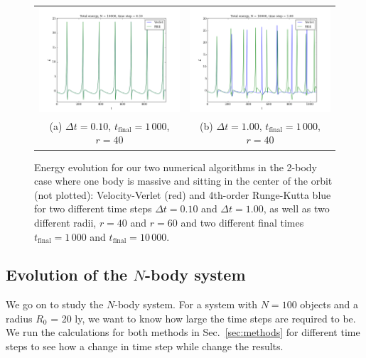 \documentclass{article}
\begin{document}
\begin{multicols}{2}
\begin{figure}
\begin{center}
\begin{tabular}{cc}
  	\includegraphics[width=90mm]{Images/binary_E_01.png}
	& \includegraphics[width=90mm]{Images/binary_E_1.png} \\
	(a) $\Delta t = 0.10$, $t_{\mathrm{final}} = 1\,000$, $r = 40$				& (b) $\Delta t = 1.00$, $t_{\mathrm{final}} = 1\,000$, $r = 40$  \\[6pt]
\end{tabular}
\caption{Energy evolution for our two numerical algorithms in the 2-body case where one body is massive and sitting in the center of the orbit (not plotted): Velocity-Verlet (red) and 4th-order Runge-Kutta blue for two different time steps $\Delta t = 0.10$ and $\Delta t = 1.00$, as well as two different radii, $r = 40$ and $r = 60$ and two different final times $t_{\mathrm{final}} = 1\,000$ and $t_{\mathrm{final}} = 10\,000$.}\label{fig:2_body_energy}
\end{center}
\end{figure}



\subsection{Evolution of the $N$-body system}
We go on to study the $N$-body system. For a system with $N = 100$ objects and a radius $R_0$ = 20 ly, we want to know how large the time steps are required to be. We run the calculations for both methods in Sec.~\ref{sec:methods} for different time steps to see how a change in time step while change the results.


\end{multicols}
\end{document}
